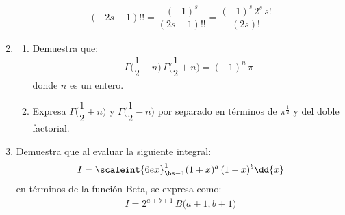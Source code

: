 \begin{enumerate}
\begin{align*}
(- 2 s - 1)!! = \dfrac{(-1)^{s}}{(2 s - 1)!!} = \dfrac{(-1)^{s} \, 2^{s} \, s!}{(2 s)!}
\end{align*}
\item \begin{enumerate}[label=\alph*)]
\item Demuestra que:
\begin{align*}
\Gamma \bigg( \dfrac{1}{2} - n \bigg) \, \Gamma \bigg( \dfrac{1}{2} + n \bigg) = (-1)^{n} \, \pi
\end{align*}
donde $n$ es un entero.
\item Expresa $\Gamma \bigg( \dfrac{1}{2} + n \bigg)$ y $\Gamma \bigg( \dfrac{1}{2} - n \bigg)$ por separado en términos de $\pi^{\frac{1}{2}}$ y del doble factorial.
\end{enumerate}
\item Demuestra que al evaluar la siguiente integral:
\begin{align*}
I = \scaleint{6ex}_{\bs -1}^{1} (1 + x)^{a} \, (1 - x)^{b} \dd{x}
\end{align*}
en términos de la función Beta, se expresa como:
\begin{align*}
I = 2^{a+b+1} \, B \big( a + 1, b + 1 \big)
\end{align*}
\end{enumerate}
